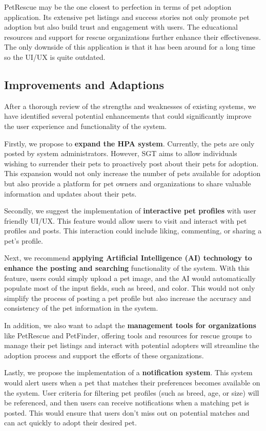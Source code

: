 PetRescue may be the one closest to perfection in terms of pet adoption application. Its extensive pet listings and success stories not only promote pet adoption but also build trust and engagement with users. The educational resources and support for rescue organizations further enhance their effectiveness. The only downside of this application is that it has been around for a long time so the UI/UX is quite outdated.


\subsection{Improvements and Adaptions}

After a thorough review of the strengths and weaknesses of existing systems, we have identified several potential enhancements that could significantly improve the user experience and functionality of the system.

Firstly, we propose to \textbf{expand the HPA system}. Currently, the pets are only posted by system administrators. However, SGT aims to allow individuals wishing to surrender their pets to proactively post about their pets for adoption. This expansion would not only increase the number of pets available for adoption but also provide a platform for pet owners and organizations to share valuable information and updates about their pets.

Secondly, we suggest the implementation of \textbf{interactive pet profiles} with user friendly UI/UX. This feature would allow users to visit and interact with pet profiles and posts. This interaction could include liking, commenting, or sharing a pet’s profile.

Next, we recommend \textbf{applying Artificial Intelligence (AI) technology to enhance the posting and searching} functionality of the system. With this feature, users could simply upload a pet image, and the AI would automatically populate most of the input fields, such as breed, and color. This would not only simplify the process of posting a pet profile but also increase the accuracy and consistency of the pet information in the system.

In addition, we also want to adapt the \textbf{management tools for organizations} like PetRescue and PetFinder, offering tools and resources for rescue groups to manage their pet listings and interact with potential adopters will streamline the adoption process and support the efforts of these organizations.

Lastly, we propose the implementation of a \textbf{notification system}. This system would alert users when a pet that matches their preferences becomes available on the system. User criteria for filtering pet profiles (such as breed, age, or size) will be referenced, and then users can receive notifications when a matching pet is posted. This would ensure that users don’t miss out on potential matches and can act quickly to adopt their desired pet.

